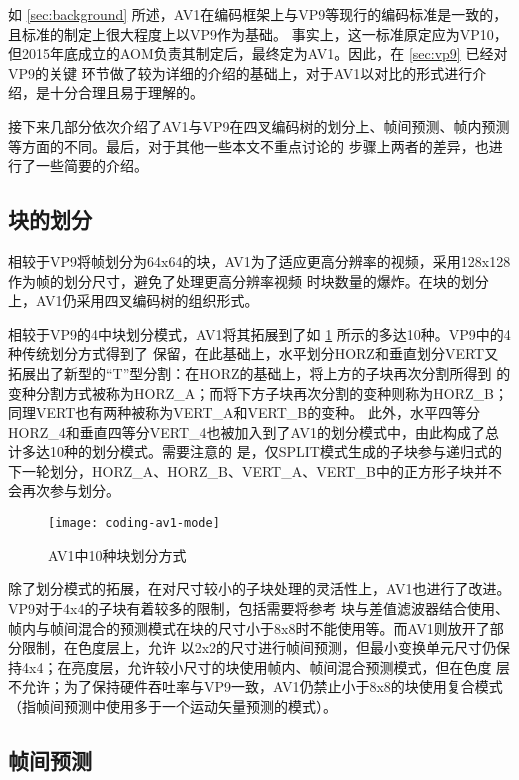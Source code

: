 如 \ref{sec:background} 所述，AV1在编码框架上与VP9等现行的编码标准是一致的，且标准的制定上很大程度上以VP9作为基础。
事实上，这一标准原定应为VP10，但2015年底成立的AOM负责其制定后，最终定为AV1。因此，在 \ref{sec:vp9} 已经对VP9的关键
环节做了较为详细的介绍的基础上，对于AV1以对比的形式进行介绍，是十分合理且易于理解的。

接下来几部分依次介绍了AV1与VP9在四叉编码树的划分上、帧间预测、帧内预测等方面的不同。最后，对于其他一些本文不重点讨论的
步骤上两者的差异，也进行了一些简要的介绍。

\subsection{块的划分}

相较于VP9将帧划分为64x64的块，AV1为了适应更高分辨率的视频，采用128x128作为帧的划分尺寸，避免了处理更高分辨率视频
时块数量的爆炸。在块的划分上，AV1仍采用四叉编码树的组织形式。

相较于VP9的4中块划分模式，AV1将其拓展到了如 \ref{fig:coding-av1-mode} 所示的多达10种。VP9中的4种传统划分方式得到了
保留，在此基础上，水平划分HORZ和垂直划分VERT又拓展出了新型的“T”型分割：在HORZ的基础上，将上方的子块再次分割所得到
的变种分割方式被称为HORZ\_A；而将下方子块再次分割的变种则称为HORZ\_B；同理VERT也有两种被称为VERT\_A和VERT\_B的变种。
此外，水平四等分HORZ\_4和垂直四等分VERT\_4也被加入到了AV1的划分模式中，由此构成了总计多达10种的划分模式。需要注意的
是，仅SPLIT模式生成的子块参与递归式的下一轮划分，HORZ\_A、HORZ\_B、VERT\_A、VERT\_B中的正方形子块并不会再次参与划分。

\begin{figure}[H] %
  \centering
  \texttt{[image: coding-av1-mode]}
  \caption{AV1中10种块划分方式}
  \label{fig:coding-av1-mode}
\end{figure}

除了划分模式的拓展，在对尺寸较小的子块处理的灵活性上，AV1也进行了改进。VP9对于4x4的子块有着较多的限制，包括需要将参考
块与差值滤波器结合使用、帧内与帧间混合的预测模式在块的尺寸小于8x8时不能使用等。而AV1则放开了部分限制，在色度层上，允许
以2x2的尺寸进行帧间预测，但最小变换单元尺寸仍保持4x4；在亮度层，允许较小尺寸的块使用帧内、帧间混合预测模式，但在色度
层不允许；为了保持硬件吞吐率与VP9一致，AV1仍禁止小于8x8的块使用复合模式（指帧间预测中使用多于一个运动矢量预测的模式）。

\subsection{帧间预测}

